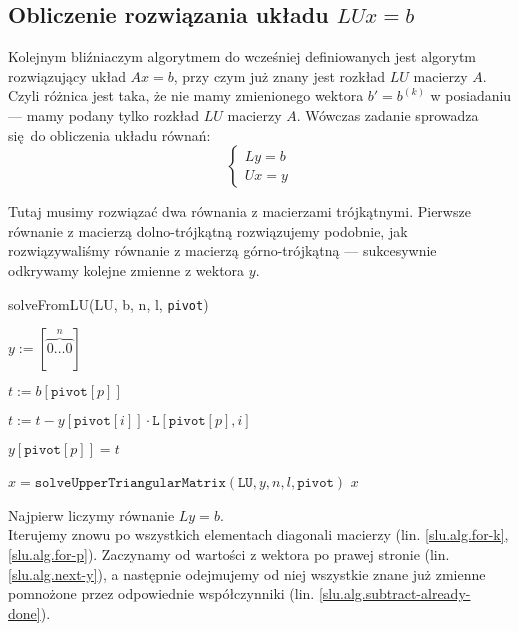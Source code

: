 \documentclass[10pt]{article}
\begin{document}
\subsection{Obliczenie rozwiązania układu $LUx = b$}

Kolejnym bliźniaczym algorytmem do wcześniej definiowanych jest algorytm rozwiązujący układ $Ax = b$, przy czym już znany jest rozkład $LU$ macierzy $A$.
Czyli różnica jest taka, że nie mamy zmienionego wektora $b' = b^{(k)}$ w posiadaniu — mamy podany tylko rozkład $LU$ macierzy $A$.
Wówczas zadanie sprowadza się do obliczenia układu równań:
$$
\begin{cases}
    Ly = b\\
    Ux = y
\end{cases}
$$

Tutaj musimy rozwiązać dwa równania z macierzami trójkątnymi. Pierwsze równanie z macierzą dolno-trójkątną rozwiązujemy podobnie, jak rozwiązywaliśmy równanie z macierzą górno-trójkątną — sukcesywnie odkrywamy kolejne zmienne z wektora $y$.

\begin{algorithm}[H]
    \caption{solveFromLU(LU, b, n, l, \texttt{pivot})}
    \begin{algorithmic}[1]
        \State $y := [\overbrace{0 \dots 0}^{n}]$
        \label{slu.alg.for-k}
            \label{slu.alg.for-p}

                \State $t := b\left[\texttt{pivot}[p]\right]$\label{slu.alg.next-y}


                    \State $t := t - y[\texttt{pivot}[i]] \cdot \texttt{L}\left[\texttt{pivot}[p], i\right]$\label{slu.alg.subtract-already-done}

                \EndFor

                \State $y[\texttt{pivot}[p]] = t$

            \EndFor
        \EndFor

        \State $x = \texttt{solveUpperTriangularMatrix}(\texttt{LU}, y, n, l, \texttt{pivot})$
        \State \Return $x$
    \end{algorithmic}
\end{algorithm}

\noindent Najpierw liczymy równanie $Ly = b$.\\
Iterujemy znowu po wszystkich elementach diagonali macierzy (lin. \ref*{slu.alg.for-k}, \ref*{slu.alg.for-p}). Zaczynamy od wartości z wektora po prawej stronie (lin. \ref*{slu.alg.next-y}), a następnie odejmujemy od niej wszystkie znane już zmienne pomnożone przez odpowiednie współczynniki (lin. \ref*{slu.alg.subtract-already-done}).
\end{document}
